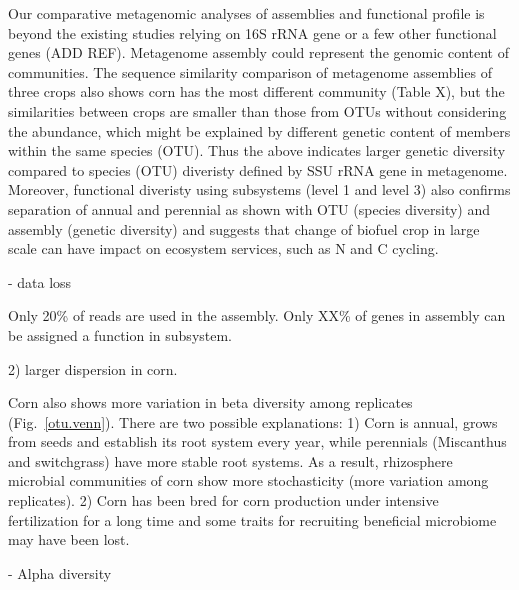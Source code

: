 \documentclass[12pt]{article}
\begin{document}
Our comparative metagenomic analyses of assemblies and functional profile is beyond the existing studies relying on 16S rRNA gene or a few other functional genes (ADD REF). Metagenome assembly could represent the genomic content of communities. The sequence similarity comparison of metagenome assemblies of three crops also shows corn has the most different community (Table X), but the similarities between crops are smaller than those from OTUs without considering the abundance, which might be explained by different genetic content of members within the same species (OTU). Thus the above indicates larger genetic diversity compared to species (OTU) diveristy defined by SSU rRNA gene in metagenome. Moreover, functional diveristy using subsystems (level 1 and level 3) also confirms separation of annual and perennial as shown with OTU (species diversity) and assembly (genetic diversity) and suggests that change of biofuel crop in large scale can have impact on ecosystem services, such as N and C cycling.

- data loss

Only 20\% of reads are used in the assembly. Only XX\% of genes in assembly can be assigned a function in subsystem.

2) larger dispersion in corn.

Corn also shows more variation in beta diversity among replicates (Fig.~\ref{otu.venn}). There are two possible explanations: 1) Corn is annual, grows from seeds and establish its root system every year, while perennials (Miscanthus and switchgrass) have more stable root systems. As a result, rhizosphere microbial communities of corn show more stochasticity (more variation among replicates). 2) Corn has been bred for corn production under intensive fertilization for a long time and some traits for recruiting beneficial microbiome may have been lost.

- Alpha diversity
\end{document}
